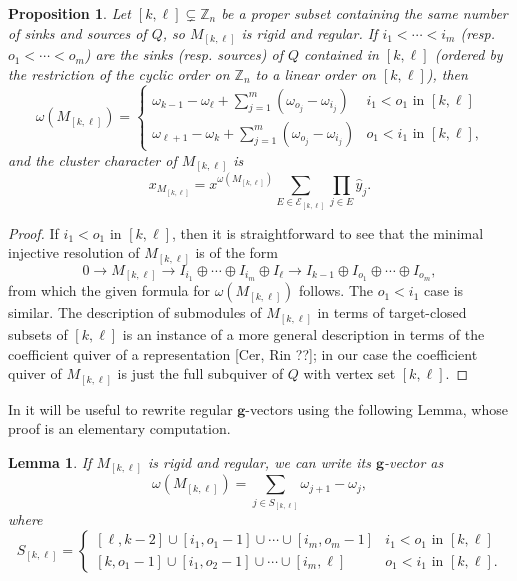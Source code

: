 \documentclass[12pt]{amsart}
\newcommand{\sayDR}[1]{\say[DR]{\color{red}{\bf DR:}\;#1}}
\newcommand{\ZZ}{\mathbb{Z}}
\newcommand{\bfg}{\mathbf{g}}
\newcommand{\gv}{\omega}
\newcommand{\grep}{\gv}
\newcommand{\cE}{\mathcal{E}}
\newcommand{\Qrep}{M}
\newtheorem{lemma}[theorem]{Lemma}
\newtheorem{proposition}[theorem]{Proposition}
\theoremstyle{remark}
\numberwithin{equation}{section}
\numberwithin{figure}{section}
\begin{document}
\begin{proposition}
  \label{prop:regular coindices}
  Let $[k,\ell] \subsetneq \ZZ_n$ be a proper subset containing the same number of sinks and sources of $Q$, so $\Qrep_{[k,\ell]}$ is rigid and regular.
  If $i_1 < \cdots < i_m$ (resp. $o_1 < \cdots < o_m$) are the sinks (resp. sources) of $Q$ contained in $[k,\ell]$ (ordered by the restriction of the cyclic order on $\ZZ_n$ to a linear order on $[k,\ell]$), then 
  \[
    \grep(\Qrep_{[k,\ell]}) 
    = 
    \begin{cases} 
      \omega_{k-1}-\omega_\ell+\sum_{j=1}^m (\omega_{o_j}-\omega_{i_j}) & \text{$i_1<o_1$ in $[k,\ell]$}\\ 
      \omega_{\ell+1}-\omega_k+\sum_{j=1}^m (\omega_{o_j}-\omega_{i_j}) & \text{$o_1 < i_1$ in $[k,\ell]$,}
    \end{cases}
  \]
  and the cluster character of $\Qrep_{[k,\ell]}$ is 
  \begin{equation}
    \label{eq:regular cluster characters}
    x_{\Qrep_{[k,\ell]}} 
    = 
    x^{\grep(\Qrep_{[k,\ell]})} \sum_{E \in \cE_{[k,\ell]}} \prod_{j \in E} \hat{y}_j.
  \end{equation}
\end{proposition}
\begin{proof}
  If $i_1 < o_1$ in $[k,\ell]$, then it is straightforward to see that the minimal injective resolution of $\Qrep_{[k,\ell]}$ is of the form
  \[
    0
    \to 
    \Qrep_{[k,\ell]} 
    \to 
    I_{i_1} \oplus \cdots \oplus I_{i_m}\oplus I_\ell 
    \to 
    I_{k-1} \oplus I_{o_1} \oplus \cdots \oplus I_{o_m},
  \] 
  from which the given formula for $\grep(\Qrep_{[k,\ell]})$ follows.
  The $o_1 < i_1$ case is similar.
  The description of submodules of $\Qrep_{[k,\ell]}$ in terms of target-closed subsets of $[k,\ell]$ is an instance of a more general description in terms of the coefficient quiver of a representation [Cer, Rin ??]\sayDR{references needed}; in our case the coefficient quiver of $\Qrep_{[k,\ell]}$ is just the full subquiver of $Q$ with vertex set $[k,\ell]$.
\end{proof}

In  it will be useful to rewrite regular $\bfg$-vectors using the following Lemma, whose proof is an elementary computation.

\begin{lemma}\label{lem:regulargvectors}
  If $\Qrep_{[k,\ell]}$ is rigid and regular, we can write its $\bfg$-vector as
  \[
    \grep(\Qrep_{[k,\ell]})=\sum_{j\in S_{[k,\ell]}} \omega_{j+1} - \omega_j,
  \]
  where 
  \[
    S_{[k,\ell]} 
    = 
    \begin{cases} 
      [\ell,k-2] \cup [i_1, o_1 -1] \cup \cdots \cup [i_m, o_m - 1] & \text{$i_1<o_1$ in $[k,\ell]$}\\ 
      [k,o_1-1] \cup [i_1,o_2-1] \cup \cdots \cup [i_m,\ell] & \text{$o_1 < i_1$ in $[k,\ell]$.}
    \end{cases}
  \]
\end{lemma}
\end{document}
